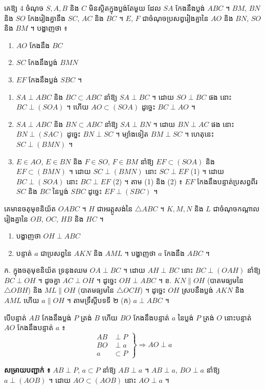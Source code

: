 \begin{example}[លំហាត់គំរូ]
គេឱ្យ $4$ ចំណុច $S, A, B$ និង $C$ មិនស្ថិតក្នុងប្លង់តែមួយ ដែល $SA$ កែងនឹងប្លង់ $ABC$ ។ $BM$, $BN$ និង $SO$ កែងរៀងគ្នានឹង $SC$, $AC$ និង $BC$ ។ $E$, $F$ ជាចំណុចប្រសព្វរៀងគ្នានៃ $AO$ និង $BN$, $SO$ និង $BM$ ។ បង្ហាញថា ៖
\begin{enumerate}[a]
  \item $AO$ កែងនឹង $BC$
  \item $SC$ កែងនឹងប្លង់ $BMN$
  \item $EF$ កែងនឹងប្លង់ $SBC$ ។
\end{enumerate}
\ans
\begin{enumerate}[a]
  \item $SA \perp ABC$ និង $BC \subset ABC$ នាំឱ្យ $SA \perp BC$ ។ ដោយ $SO \perp BC$ ផង នោះ $BC \perp (SOA)$ ។ ហើយ $AO \subset (SOA)$ ដូច្នេះ $BC \perp AO$ ។
  \item $SA \perp ABC$ និង $BN \subset ABC$ នាំឱ្យ $SA \perp BN$ ។ ដោយ $BN \perp AC$ ផង នោះ $BN \perp (SAC)$ ដូច្នេះ $BN \perp SC$ ។ ម្យ៉ាងទៀត $BM \perp SC$ ។ ហេតុនេះ $SC \perp (BMN)$ ។
  \item $E \in AO$, $E \in BN$ និង $F \in SO$, $F \in BM$ នាំឱ្យ $EF \subset (SOA)$ និង $EF \subset (BMN)$ ។ ដោយ $SC \perp (BMN)$ នោះ $SC \perp EF$ \quad (1) ។ ដោយ $BC \perp (SOA)$ នោះ $BC \perp EF$ \quad (2) ។ តាម (1) និង (2) ៖ $EF$ កែងនឹងបន្ទាត់ប្រសព្វពីរ $SC$ និង $BC$ នៃប្លង់ $SBC$ ដូច្នេះ $EF \perp (SBC)$ ។
\end{enumerate}
\end{example}

\begin{pro}
គេមានចតុមុខនិយ័ត $OABC$ ។ $H$ ជាអរត្តូសង់នៃ $\triangle ABC$ ។ $K, M, N$ និង $L$ ជាចំណុចកណ្ដាលរៀងគ្នានៃ $OB$, $OC$, $HB$ និង $HC$ ។
\begin{enumerate}[a]
  \item បង្ហាញថា $OH \perp ABC$
  \item បន្ទាត់ $a$ ជាប្រសព្វនៃ $AKN$ និង $AML$ ។ បង្ហាញថា $a$ កែងនឹង $ABC$ ។
\end{enumerate}
\ans
ក. ក្នុងចតុមុខនិយ័ត ទ្រនុងឈម $OA \perp BC$ ។ ដោយ $AH \perp BC$ នោះ $BC \perp (OAH)$ នាំឱ្យ $BC \perp OH$ ។ ដូចគ្នា $AC \perp OH$ ។ ដូច្នេះ $OH \perp ABC$ ។ \quad ខ. $KN \parallel OH$ (បាតមធ្យមនៃ $\triangle OBH$) និង $ML \parallel OH$ (បាតមធ្យមនៃ $\triangle OCH$) ។ ដូច្នេះ $OH$ ស្របនឹងប្លង់ $AKN$ និង $AML$ ហើយ $a \parallel OH$ ។ តាមទ្រឹស្ដីបទទី ២ (ក) $a \perp ABC$ ។
\end{pro}

\begin{theorem}[ទ្រឹស្ដីបទបីបន្ទាត់កែង]
បើបន្ទាត់ $AB$ កែងនឹងប្លង់ $P$ ត្រង់ $B$ ហើយ $BO$ កែងនឹងបន្ទាត់ $a$ នៃប្លង់ $P$ ត្រង់ $O$ នោះបន្ទាត់ $AO$ កែងនឹងបន្ទាត់ $a$ ៖
\[
\left.\begin{aligned} AB &\perp P\\ BO &\perp a\\ a &\subset P \end{aligned}\right\} \Rightarrow AO \perp a
\]
\end{theorem}
\textbf{សម្រាយបញ្ជាក់ ៖} $AB \perp P$, $a \subset P$ នាំឱ្យ $AB \perp a$ ។ $AB \perp a$, $BO \perp a$ នាំឱ្យ $a \perp (AOB)$ ។ ដោយ $AO \subset (AOB)$ នោះ $AO \perp a$ ។

